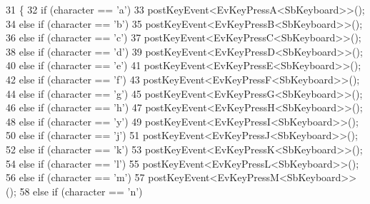 \begin{DoxyCode}
31         \{
32                 \textcolor{keywordflow}{if} (character == \textcolor{charliteral}{'a'})
33                         postKeyEvent<EvKeyPressA<SbKeyboard>>();
34                 \textcolor{keywordflow}{else} \textcolor{keywordflow}{if} (character == \textcolor{charliteral}{'b'})
35                         postKeyEvent<EvKeyPressB<SbKeyboard>>();
36                 \textcolor{keywordflow}{else} \textcolor{keywordflow}{if} (character == \textcolor{charliteral}{'c'})
37                         postKeyEvent<EvKeyPressC<SbKeyboard>>();
38                 \textcolor{keywordflow}{else} \textcolor{keywordflow}{if} (character == \textcolor{charliteral}{'d'})
39                         postKeyEvent<EvKeyPressD<SbKeyboard>>();
40                 \textcolor{keywordflow}{else} \textcolor{keywordflow}{if} (character == \textcolor{charliteral}{'e'})
41                         postKeyEvent<EvKeyPressE<SbKeyboard>>();
42                 \textcolor{keywordflow}{else} \textcolor{keywordflow}{if} (character == \textcolor{charliteral}{'f'})
43                         postKeyEvent<EvKeyPressF<SbKeyboard>>();
44                 \textcolor{keywordflow}{else} \textcolor{keywordflow}{if} (character == \textcolor{charliteral}{'g'})
45                         postKeyEvent<EvKeyPressG<SbKeyboard>>();
46                 \textcolor{keywordflow}{else} \textcolor{keywordflow}{if} (character == \textcolor{charliteral}{'h'})
47                         postKeyEvent<EvKeyPressH<SbKeyboard>>();
48                 \textcolor{keywordflow}{else} \textcolor{keywordflow}{if} (character == \textcolor{charliteral}{'y'})
49                         postKeyEvent<EvKeyPressI<SbKeyboard>>();
50                 \textcolor{keywordflow}{else} \textcolor{keywordflow}{if} (character == \textcolor{charliteral}{'j'})
51                         postKeyEvent<EvKeyPressJ<SbKeyboard>>();
52                 \textcolor{keywordflow}{else} \textcolor{keywordflow}{if} (character == \textcolor{charliteral}{'k'})
53                         postKeyEvent<EvKeyPressK<SbKeyboard>>();
54                 \textcolor{keywordflow}{else} \textcolor{keywordflow}{if} (character == \textcolor{charliteral}{'l'})
55                         postKeyEvent<EvKeyPressL<SbKeyboard>>();
56                 \textcolor{keywordflow}{else} \textcolor{keywordflow}{if} (character == \textcolor{charliteral}{'m'})
57                         postKeyEvent<EvKeyPressM<SbKeyboard>>();
58                 \textcolor{keywordflow}{else} \textcolor{keywordflow}{if} (character == \textcolor{charliteral}{'n'})

\end{DoxyCode}
